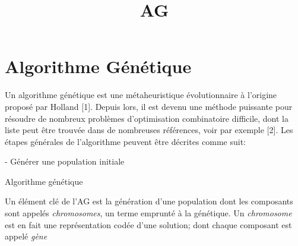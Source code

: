 \documentclass{report}
\begin{document}
\title{AG}
\chapter{Algorithme Génétique}
Un algorithme génétique est une métaheuristique évolutionnaire à l'origine proposé par Holland [1]. Depuis lors, il est devenu une méthode puissante pour résoudre de nombreux problèmes d'optimisation combinatoire difficile, dont la liste peut être trouvée dans de nombreuses références, voir par exemple [2]. Les étapes générales de l'algorithme peuvent être décrites comme suit:
\newline

\begin{algorithm}[H]
\SetAlgoLined
 - Générer une population initiale\;
 \caption{Algorithme génétique}
\end{algorithm}

Un élément clé de l'AG est la génération d'une population dont les composants sont appelés \textit{chromosomes}, un terme emprunté à la génétique. Un \textit{chromosome} est en fait une représentation codée d'une solution; dont chaque composant est appelé \textit{gène}
\end{document}
